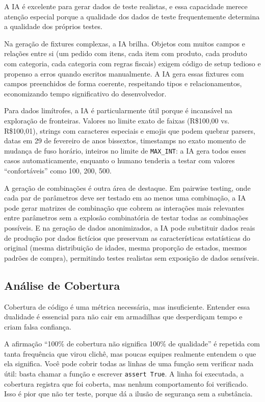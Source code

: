 A IA é excelente para gerar dados de teste realistas, e essa capacidade merece
atenção especial porque a qualidade dos dados de teste frequentemente determina
a qualidade dos próprios testes.

Na geração de fixtures complexas, a IA brilha. Objetos com muitos campos e
relações entre si (um pedido com itens, cada item com produto, cada produto
com categoria, cada categoria com regras fiscais) exigem código de setup
tedioso e propenso a erros quando escritos manualmente. A IA gera essas
fixtures com campos preenchidos de forma coerente, respeitando tipos e
relacionamentos, economizando tempo significativo do desenvolvedor.

Para dados limítrofes, a IA é particularmente útil porque é incansável na
exploração de fronteiras. Valores no limite exato de faixas (R\$100,00 vs.
R\$100,01), strings com caracteres especiais e emojis que podem quebrar
parsers, datas em 29 de fevereiro de anos bissextos, timestamps no exato
momento de mudança de fuso horário, inteiros no limite de \texttt{MAX\_INT}:
a IA gera todos esses casos automaticamente, enquanto o humano tenderia a
testar com valores ``confortáveis'' como 100, 200, 500.

A geração de combinações é outra área de destaque. Em pairwise testing, onde
cada par de parâmetros deve ser testado em ao menos uma combinação, a IA pode
gerar matrizes de combinação que cobrem as interações mais relevantes entre
parâmetros sem a explosão combinatória de testar todas as combinações possíveis.
E na geração de dados anonimizados, a IA pode substituir dados reais de
produção por dados fictícios que preservam as características estatísticas do
original (mesma distribuição de idades, mesma proporção de estados, mesmos
padrões de compra), permitindo testes realistas sem exposição de dados sensíveis.

\subsection{Análise de Cobertura}

Cobertura de código é uma métrica necessária, mas insuficiente. Entender essa
dualidade é essencial para não cair em armadilhas que desperdiçam tempo e criam
falsa confiança.

A afirmação ``100\% de cobertura não significa 100\% de qualidade'' é repetida
com tanta frequência que virou clichê, mas poucas equipes realmente entendem o
que ela significa. Você pode cobrir todas as linhas de uma função sem
verificar nada útil: basta chamar a função e escrever \texttt{assert True}. A
linha foi executada, a cobertura registra que foi coberta, mas nenhum
comportamento foi verificado. Isso é pior que não ter teste, porque dá a ilusão
de segurança sem a substância.

